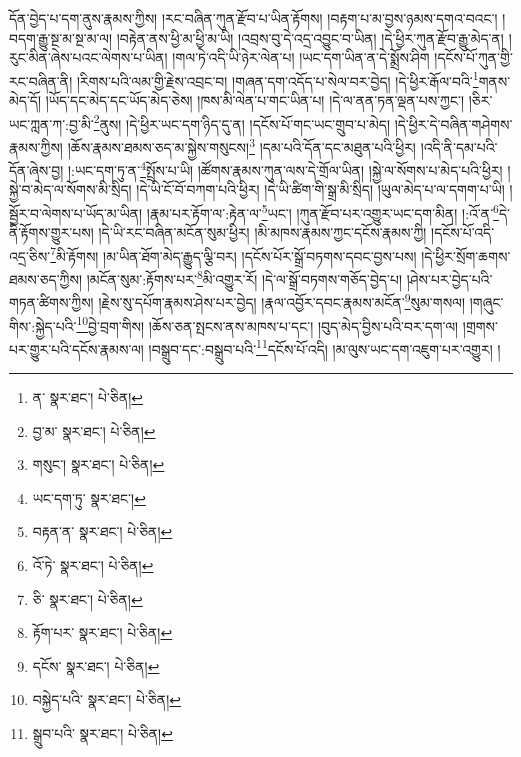 དོན་བྱེད་པ་དག་ནུས་རྣམས་ཀྱིས། །རང་བཞིན་ཀུན་རྫོབ་པ་ཡིན་རྟོགས། །བརྟག་པ་མ་བྱས་ཉམས་དགའ་བའང་། །བདག་རྒྱུ་སྔ་མ་སྔ་མ་ལ། །བརྟེན་ནས་ཕྱི་མ་ཕྱི་མ་ཡི། །འབྲས་བུ་དེ་འདྲ་འབྱུང་བ་ཡིན། །དེ་ཕྱིར་ཀུན་རྫོབ་རྒྱུ་མེད་ན། །རུང་མིན་ཞེས་པའང་ལེགས་པ་ཡིན། །གལ་ཏེ་འདི་ཡི་ཉེར་ལེན་པ། །ཡང་དག་ཡིན་ན་དེ་སྨྲོས་ཤིག །དངོས་པོ་ཀུན་གྱི་རང་བཞིན་ནི། །རིགས་པའི་ལམ་གྱི་རྗེས་འབྲང་བ། །གཞན་དག་འདོད་པ་སེལ་བར་བྱེད། །དེ་ཕྱིར་རྒོལ་བའི་\footnote{ན་  སྣར་ཐང་།  པེ་ཅིན། }གནས་མེད་དོ། །ཡོད་དང་མེད་དང་ཡོད་མེད་ཅེས། །ཁས་མི་ལེན་པ་གང་ཡིན་པ། །དེ་ལ་ནན་ཏན་ལྡན་པས་ཀྱང་། །ཅིར་ཡང་ཀླན་ཀ་:བྱ་མི་\footnote{བྱ་མ་  སྣར་ཐང་།  པེ་ཅིན། }ནུས། །དེ་ཕྱིར་ཡང་དག་ཉིད་དུ་ན། །དངོས་པོ་གང་ཡང་གྲུབ་པ་མེད། །དེ་ཕྱིར་དེ་བཞིན་གཤེགས་རྣམས་ཀྱིས། །ཆོས་རྣམས་ཐམས་ཅད་མ་སྐྱེས་གསུངས།\footnote{གསུང་།  སྣར་ཐང་།  པེ་ཅིན། } །དམ་པའི་དོན་དང་མཐུན་པའི་ཕྱིར། །འདི་ནི་དམ་པའི་དོན་ཞེས་བྱ། །:ཡང་དག་ཏུ་ན་\footnote{ཡང་དག་ཏུ་  སྣར་ཐང་། }སྤྲོས་པ་ཡི། །ཚོགས་རྣམས་ཀུན་ལས་དེ་གྲོལ་ཡིན། །སྐྱེ་ལ་སོགས་པ་མེད་པའི་ཕྱིར། །སྐྱེ་བ་མེད་ལ་སོགས་མི་སྲིད། །དེ་ཡི་ངོ་བོ་བཀག་པའི་ཕྱིར། །དེ་ཡི་ཚིག་གི་སྒྲ་མི་སྲིད། །ཡུལ་མེད་པ་ལ་དགག་པ་ཡི། །སྦྱོར་བ་ལེགས་པ་ཡོད་མ་ཡིན། །རྣམ་པར་རྟོག་ལ་:རྟེན་ལ་\footnote{བརྟན་ན་  སྣར་ཐང་།  པེ་ཅིན། }ཡང་། །ཀུན་རྫོབ་པར་འགྱུར་ཡང་དག་མིན། །:འོ་ན་\footnote{འོ་ཏེ་  སྣར་ཐང་།  པེ་ཅིན། }དེ་ནི་རྟོགས་གྱུར་པས། །དེ་ཡི་རང་བཞིན་མངོན་སུམ་ཕྱིར། །མི་མཁས་རྣམས་ཀྱང་དངོས་རྣམས་ཀྱི། །དངོས་པོ་འདི་འདྲ་ཅིས་\footnote{ཅི་  སྣར་ཐང་།  པེ་ཅིན། }མི་རྟོགས། །མ་ཡིན་ཐོག་མེད་རྒྱུད་ལྕི་བར། །དངོས་པོར་སྒྲོ་བཏགས་དབང་བྱས་པས། །དེ་ཕྱིར་སྲོག་ཆགས་ཐམས་ཅད་ཀྱིས། །མངོན་སུམ་:རྟོགས་པར་\footnote{རྟོག་པར་  སྣར་ཐང་།  པེ་ཅིན། }མི་འགྱུར་རོ། །དེ་ལ་སྒྲོ་བཏགས་གཅོད་བྱེད་པ། །ཤེས་པར་བྱེད་པའི་གཏན་ཚིགས་ཀྱིས། །རྗེས་སུ་དཔོག་རྣམས་ཤེས་པར་བྱེད། །རྣལ་འབྱོར་དབང་རྣམས་མངོན་\footnote{དངོས་  སྣར་ཐང་།  པེ་ཅིན། }སུམ་གསལ། །གཞུང་གིས་:སྐྱེད་པའི་\footnote{བསྐྱེད་པའི་  སྣར་ཐང་།  པེ་ཅིན། }བྱེ་བྲག་གིས། །ཆོས་ཅན་སྤངས་ནས་མཁས་པ་དང་། །བུད་མེད་བྱིས་པའི་བར་དག་ལ། །གྲགས་པར་གྱུར་པའི་དངོས་རྣམས་ལ། །བསྒྲུབ་དང་:བསྒྲུབ་པའི་\footnote{སྒྲུབ་པའི་  སྣར་ཐང་།  པེ་ཅིན། }དངོས་པོ་འདི། །མ་ལུས་ཡང་དག་འཇུག་པར་འགྱུར། །
